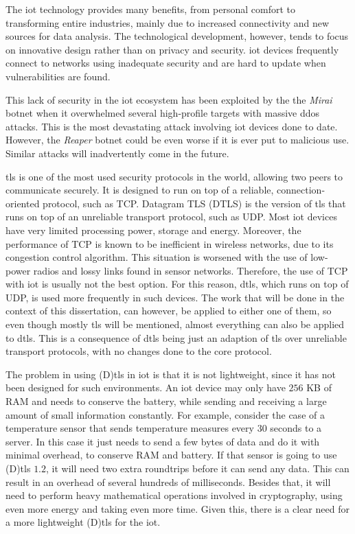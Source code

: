 \documentclass{llncs}
\begin{document}
The \gls{iot} technology provides many benefits, from personal comfort to
transforming entire industries, mainly due to increased connectivity and
new sources for data analysis. The technological development, however, tends to focus on
innovative design rather than on privacy and security. \gls{iot} devices frequently
connect to networks using inadequate security and are hard to update when
vulnerabilities are found.

This lack of security in the \gls{iot} ecosystem has been exploited by the
the \textit{Mirai} botnet\cite{sec17ant94:online} when it overwhelmed several high-profile
targets with massive \gls{ddos} attacks. This is the most devastating attack involving \gls{iot}
devices done to date. However, the \textit{Reaper} botnet\cite{ReaperCa10:online} could be
even worse if it is ever put to malicious use. Similar attacks will inadvertently
come in the future.

\gls{tls} is one of the most used security protocols in the world, allowing two peers
to communicate securely. It is designed to run on top of a reliable, connection-oriented
protocol, such as TCP. Datagram TLS (DTLS) is the version of \gls{tls} that runs on top
of an unreliable transport protocol, such as UDP. Most \gls{iot} devices have
very limited processing power, storage and energy. Moreover, the performance of
TCP is known to be inefficient in wireless networks, due to its congestion control
algorithm. This situation is worsened with the use of low-power radios and lossy
links found in sensor networks. Therefore, the use of TCP with \gls{iot}
is usually not the best option. For this reason, \gls{dtls}, which runs on top
of UDP, is used more frequently in such devices. The work that will be done in the context of this dissertation, can however,
be applied to either one of them, so even though mostly
\gls{tls} will be mentioned, almost everything can also be applied to \gls{dtls}. This is a consequence of \gls{dtls} being just an adaption of \gls{tls} over unreliable transport protocols, with no changes done to
the core protocol.

The problem in using (D)\gls{tls} in \gls{iot} is that it is not lightweight, since
it has not been designed for such environments. An \gls{iot} device may only have
$256$ KB of RAM and needs to conserve the battery, while sending and receiving
a large amount of small information constantly. For example, consider the case of a temperature sensor
that sends temperature measures every $30$ seconds to a server. In this case
it just needs to send a few bytes of data and do it with minimal overhead, to conserve
RAM and battery. If that sensor is going to use (D)\gls{tls} $1.2$, it will need
two extra roundtrips before it can send any data. This can result in an overhead of several hundreds of
milliseconds. Besides that, it will need to perform heavy mathematical operations
involved in cryptography, using even more energy and taking even more time.
Given this, there is a clear need for a more lightweight (D)\gls{tls} for the \gls{iot}.
\end{document}
